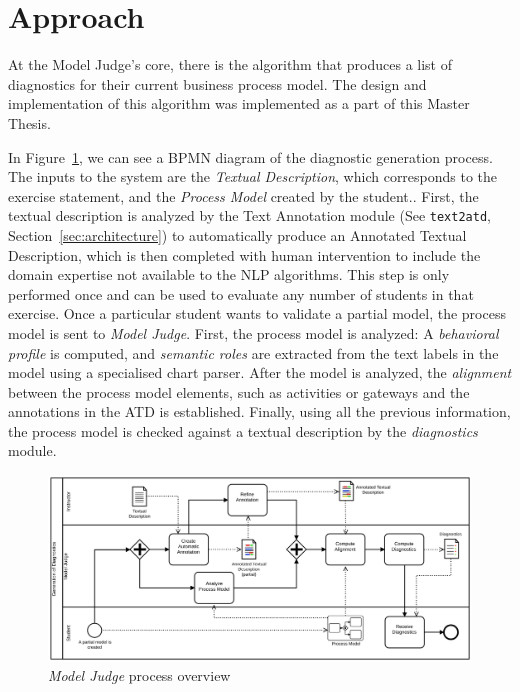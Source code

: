 \section{Approach}
\label{sec:modeljudge_approach}

At the Model Judge's core, there is the algorithm that produces a list of
diagnostics for their current business process model. The design and
implementation of this algorithm was implemented as a part of this Master Thesis.

In Figure~\ref{fig:modeljudge_overview}, we can see a BPMN diagram of the
diagnostic generation process. The inputs to the system are the \emph{Textual
  Description}, which corresponds to the exercise statement, and the
\emph{Process Model} created by the student.. First, the textual description is
analyzed by the Text Annotation module (See \texttt{text2atd},
Section~\ref{sec:architecture}) to automatically produce an Annotated
Textual Description, which is then completed with human intervention to include
the domain expertise not available to the NLP algorithms. This step is only
performed once and can be used to evaluate any number of students in that
exercise. Once a particular student wants to validate a partial model, the
process model is sent to \emph{Model Judge}. First, the process model is
analyzed: A \emph{behavioral profile} is computed, and \emph{semantic roles} are
extracted from the text labels in the model using a specialised chart parser.
After the model is analyzed, the \textit{alignment} between the process model
elements, such as activities or gateways and the annotations in the ATD is
established. Finally, using all the previous information, the process model is
checked against a textual description by the \emph{diagnostics} module.

\begin{figure}[htb]
  \centering
  \includegraphics[width=\textwidth]{figures/overview_bpmn}
  \caption{\emph{Model Judge} process overview}
  \label{fig:modeljudge_overview}
\end{figure}

